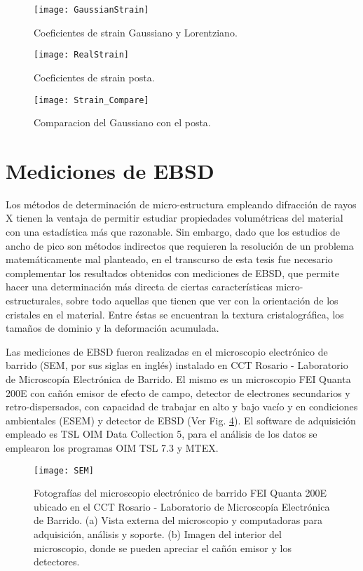 \begin{figure}[!htb]
  \centering
  \texttt{[image: GaussianStrain]}
  \caption{Coeficientes de strain Gaussiano y Lorentziano.}
  \label{fig:GaussStrainn}
\end{figure}

\begin{figure}[!htb]
  \centering
  \texttt{[image: RealStrain]}
  \caption{Coeficientes de strain posta.}
  \label{fig:RealStrain}
\end{figure}

\begin{figure}[!htb]
  \centering
  \texttt{[image: Strain\_Compare]}
  \caption{Comparacion del Gaussiano con el posta.}
  \label{fig:RealvsGauss}
\end{figure}

\newpage
\fi
\section{Mediciones de EBSD}\label{S:MatEBSD}
Los métodos de determinación de micro-estructura empleando difracción de rayos X tienen la ventaja de permitir estudiar propiedades volumétricas del material con una estadística más que razonable.
Sin embargo, dado que los estudios de ancho de pico son métodos indirectos que requieren la resolución de un problema matemáticamente mal planteado, en el transcurso de esta tesis fue necesario complementar los resultados obtenidos con mediciones de EBSD, que permite hacer una determinación más directa de ciertas características micro-estructurales, sobre todo aquellas que tienen que ver con la orientación de los cristales en el material.
Entre éstas se encuentran la textura cristalográfica, los tamaños de dominio y la deformación acumulada.

Las mediciones de EBSD fueron realizadas en el microscopio electrónico de barrido (SEM, por sus siglas en inglés) instalado en CCT Rosario - Laboratorio de Microscopía Electrónica de Barrido.
El mismo es un microscopio FEI Quanta 200E con cañón emisor de efecto de campo, detector de electrones secundarios y retro-dispersados, con capacidad de trabajar en alto y bajo vacío y en condiciones ambientales (ESEM) y detector de EBSD (Ver Fig. \ref{fig:SEM}).
El software de adquisición empleado es TSL OIM Data Collection 5, para el análisis de los datos se emplearon los programas OIM TSL 7.3 y MTEX.

\begin{figure}[!htb]
  \centering
  \texttt{[image: SEM]}
  \caption{Fotografías del microscopio electrónico de barrido FEI Quanta 200E ubicado en el CCT Rosario - Laboratorio de Microscopía Electrónica de Barrido. (a) Vista externa del microscopio y computadoras para adquisición, análisis y soporte. (b) Imagen del interior del microscopio, donde se pueden apreciar el cañón emisor y los detectores.}
  \label{fig:SEM}
\end{figure}

